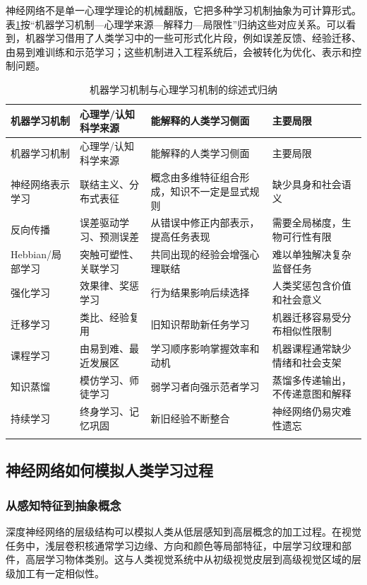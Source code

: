 \documentclass[UTF8,zihao=5,a4paper]{ctexart}
\begin{document}
神经网络不是单一心理学理论的机械翻版，它把多种学习机制抽象为可计算形式。表\ref{tab:learning_mechanism_summary}按“机器学习机制—心理学来源—解释力—局限性”归纳这些对应关系。可以看到，机器学习借用了人类学习中的一些可形式化片段，例如误差反馈、经验迁移、由易到难训练和示范学习；这些机制进入工程系统后，会被转化为优化、表示和控制问题。

\begin{longtable}{p{3.0cm}p{3.4cm}p{4.2cm}p{3.4cm}}
\toprule
机器学习机制 & 心理学/认知科学来源 & 能解释的人类学习侧面 & 主要局限 \\
\midrule
\endfirsthead
\toprule
机器学习机制 & 心理学/认知科学来源 & 能解释的人类学习侧面 & 主要局限 \\
\midrule
\endhead
神经网络表示学习 & 联结主义、分布式表征 & 概念由多维特征组合形成，知识不一定是显式规则 & 缺少具身和社会语义 \\
反向传播 & 误差驱动学习、预测误差 & 从错误中修正内部表示，提高任务表现 & 需要全局梯度，生物可行性有限 \\
Hebbian/局部学习 & 突触可塑性、关联学习 & 共同出现的经验会增强心理联结 & 难以单独解决复杂监督任务 \\
强化学习 & 效果律、奖惩学习 & 行为结果影响后续选择 & 人类奖惩包含价值和社会意义 \\
迁移学习 & 类比、经验复用 & 旧知识帮助新任务学习 & 机器迁移容易受分布相似性限制 \\
课程学习 & 由易到难、最近发展区 & 学习顺序影响掌握效率和动机 & 机器课程通常缺少情绪和社会支架 \\
知识蒸馏 & 模仿学习、师徒学习 & 弱学习者向强示范者学习 & 蒸馏多传递输出，不传递意图和解释 \\
持续学习 & 终身学习、记忆巩固 & 新旧经验不断整合 & 神经网络仍易灾难性遗忘 \\
\bottomrule
\caption{机器学习机制与心理学习机制的综述式归纳}
\label{tab:learning_mechanism_summary}\\
\end{longtable}

\subsection{神经网络如何模拟人类学习过程}

\subsubsection{从感知特征到抽象概念}

深度神经网络的层级结构可以模拟人类从低层感知到高层概念的加工过程。在视觉任务中，浅层卷积核通常学习边缘、方向和颜色等局部特征，中层学习纹理和部件，高层学习物体类别。这与人类视觉系统中从初级视觉皮层到高级视觉区域的层级加工有一定相似性。
\end{document}
